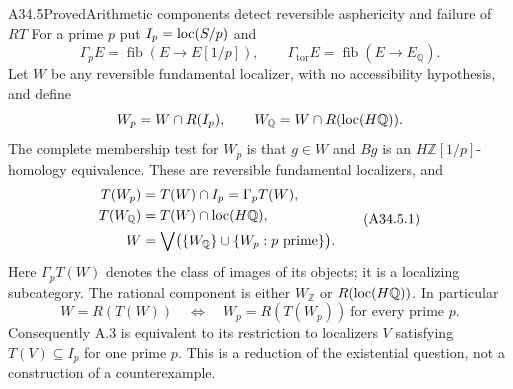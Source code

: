 \begin{claim}{A34.5}{Proved}{Arithmetic components detect reversible asphericity and failure of $RT$}\label{A345}
For a prime $p$ put $I_p=\operatorname{loc}(S/p)$ and
\[
 \Gamma_pE=\operatorname{fib}(E\longrightarrow E[1/p]),\qquad
 \Gamma_{\mathrm{tor}}E=\operatorname{fib}(E\longrightarrow E_{\mathbb Q}).
\]
Let $W$ be any reversible fundamental localizer, with no accessibility
hypothesis, and define
\[
 W_p=W\cap R(I_p),\qquad
 W_{\mathbb Q}=W\cap R(\operatorname{loc}(H\mathbb Q)).
\]
The complete membership test for $W_p$ is that $g\in W$ and $Bg$
is an $H\mathbb Z[1/p]$-homology equivalence.  These are reversible
fundamental localizers, and
\[
 \begin{split}
 T(W_p)&=T(W)\cap I_p=\Gamma_pT(W),\\
 T(W_{\mathbb Q})&=T(W)\cap\operatorname{loc}(H\mathbb Q),\\
 W&=\bigvee\bigl(\{W_{\mathbb Q}\}\cup\{W_p:p\text{ prime}\}\bigr).
 \end{split}
 \tag{A34.5.1}
\]
Here $\Gamma_pT(W)$ denotes the class of images of its objects;
it is a localizing subcategory.  The rational component is either
$W_{\mathbb Z}$ or $R(\operatorname{loc}(H\mathbb Q))$.  In particular
\[
 W=R(T(W))
 \quad\Longleftrightarrow\quad
 W_p=R(T(W_p))\ \text{for every prime }p.
 \tag{A34.5.2}
\]
Consequently A.3 is equivalent to its restriction to localizers
$V$ satisfying $T(V)\subseteq I_p$ for one prime $p$.
This is a reduction of the existential question, not a construction
of a counterexample.
\end{claim}
